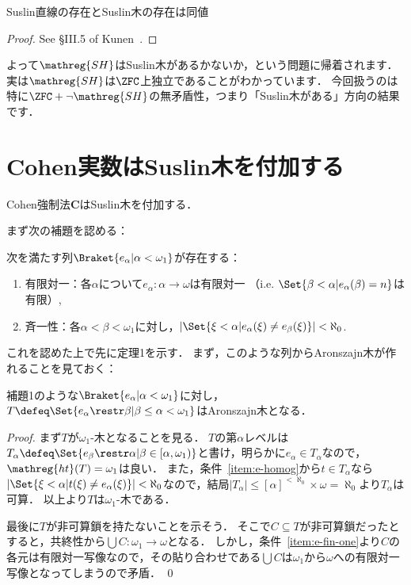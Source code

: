 \documentclass[a4j]{ltjsarticle}
\newcommand{\SH}{\mathreg{SH}}
\begin{document}
\begin{fact}
 Suslin直線の存在とSuslin木の存在は同値
\end{fact}
\begin{proof}
 See \S III.5 of Kunen~\cite{Kunen:2011}.
\end{proof}

よって$\SH$はSuslin木があるかないか，という問題に帰着されます．
実は$\SH$は$\ZFC$上独立であることがわかっています．
今回扱うのは特に$\ZFC+\neg \SH$の無矛盾性，つまり「Suslin木がある」方向の結果です．

\section{Cohen実数はSuslin木を付加する}

\begin{theorem}
 Cohen強制法$\mathbf{C}$はSuslin木を付加する．
\end{theorem}

まず次の補題を認める：

\begin{lemma}
 次を満たす列$\Braket{e_\alpha | \alpha < \omega_1}$が存在する：
 \begin{enumerate}
  \item \label{item:e-fin-one}有限対一：各$\alpha$について$e_\alpha : \alpha \to \omega$は有限対一
        （i.e. $\Set{ \beta < \alpha | e_\alpha(\beta) = n }$は有限）,
  \item \label{item:e-homog}斉一性：各$\alpha < \beta < \omega_1$に対し，$\left|\Set{\xi < \alpha | e_\alpha(\xi) \neq e_\beta(\xi)}\right| < \aleph_0$.
 \end{enumerate}
\end{lemma}

これを認めた上で先に定理1を示す．
まず，このような列からAronszajn木が作れることを見ておく：

\begin{lemma}
 補題1のような$\Braket{e_\alpha | \alpha < \omega_1}$に対し，$T \defeq \Set{e_\alpha \restr \beta | \beta \leq \alpha < \omega_1}$はAronszajn木となる．
\end{lemma}
\begin{proof}
 まず$T$が$\omega_1$-木となることを見る．
 $T$の第$\alpha$レベルは$T_\alpha \defeq \Set{ e_\beta \restr \alpha | \beta \in [\alpha, \omega_1)}$と書け，明らかに$e_\alpha \in T_\alpha$なので，$\mathop{\mathreg{ht}}(T) = \omega_1$は良い．
 また，条件~\ref{item:e-homog}から$t \in T_\alpha$なら$|\Set{\xi < \alpha | t(\xi) \neq e_\alpha(\xi)}| < \aleph_0$なので，結局$|T_\alpha| \leq [\alpha]^{<\aleph_0} \times \omega = \aleph_0$より$T_\alpha$は可算．
 以上より$T$は$\omega_1$-木である．

 最後に$T$が非可算鎖を持たないことを示そう．
 そこで$C \subseteq T$が非可算鎖だったとすると，共終性から$\bigcup C: \omega_1 \to \omega$となる．
 しかし，条件~\ref{item:e-fin-one}より$C$の各元は有限対一写像なので，その貼り合わせである$\bigcup C$は$\omega_1$から$\omega$への有限対一写像となってしまうので矛盾． \qed
\end{proof}
\end{document}
